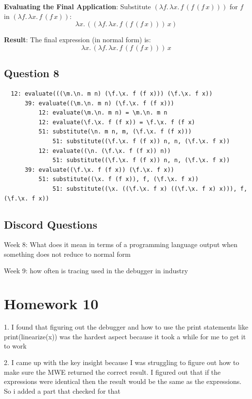 \documentclass{article}
\theoremstyle{plain}
\theoremstyle{definition}
\theoremstyle{remark}
\begin{document}
\textbf{Evaluating the Final Application}:
Substitute \((\lambda f.\, \lambda x.\, f \, (f \, (f \, x)))\) for \(f\) in \((\lambda f.\, \lambda x.\, f \, (f \, x))\):
\[
\lambda x.\, ((\lambda f.\, \lambda x.\, f \, (f \, (f \, x))) \, x)
\]

\textbf{Result}:
The final expression (in normal form) is:
\[
\lambda x.\, (\lambda f.\, \lambda x.\, f \, (f \, (f \, x))) \, x
\]

\subsection{Question 8}

\begin{verbatim}
  12: evaluate(((\m.\n. m n) (\f.\x. f (f x))) (\f.\x. f x))
      39: evaluate((\m.\n. m n) (\f.\x. f (f x)))
          12: evaluate(\m.\n. m n) = \m.\n. m n
          12: evaluate(\f.\x. f (f x)) = \f.\x. f (f x)
          51: substitute(\n. m n, m, (\f.\x. f (f x)))
              51: substitute((\f.\x. f (f x)) n, n, (\f.\x. f x))
          12: evaluate((\n. (\f.\x. f (f x)) n))
              51: substitute((\f.\x. f (f x)) n, n, (\f.\x. f x))
      39: evaluate((\f.\x. f (f x)) (\f.\x. f x))
          51: substitute((\x. f (f x)), f, (\f.\x. f x))
              51: substitute((\x. ((\f.\x. f x) ((\f.\x. f x) x))), f, (\f.\x. f x))
  \end{verbatim}

\subsection{Discord Questions}

Week 8: What does it mean in terms of a programming language output when something does not reduce to normal form

Week 9: how often is tracing used in the debugger in industry


\section{Homework 10}\label{homework10}

1. I found that figuring out the debugger and how to use the print statements like print(linearize(x)) was the hardest aspect because it took a while for me to get it to work

2. I came up with the key insight because I was struggling to figure out how to make sure the MWE returned the correct result. I figured out that if the expressions were identical then the result would be the same as the expressions. So i added a part that checked for that
\end{document}
